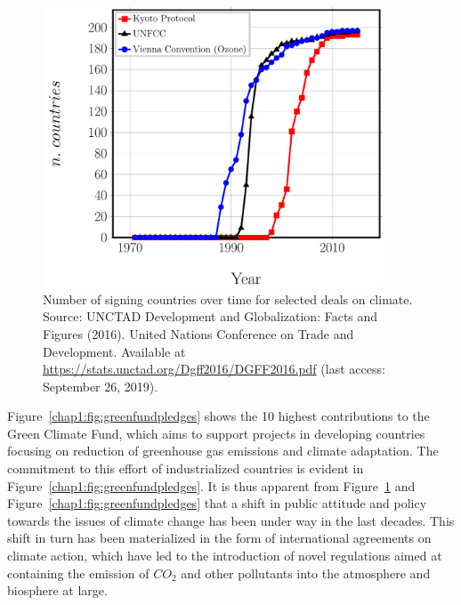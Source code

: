 \begin{description}
\begin{figure}[!h]
\includegraphics[width=0.9\textwidth]{pics/climate-deals-signataries.pdf}
\caption{Number of signing countries over time for selected deals on climate. Source: UNCTAD Development and Globalization: Facts and Figures (2016). United Nations Conference on Trade and Development. Available at \href{https://stats.unctad.org/Dgff2016/DGFF2016.pdf}{https://stats.unctad.org/Dgff2016/DGFF2016.pdf} (last access: September 26, 2019).}\label{chap1:fig:climatedealssignataries}
\end{figure}

Figure~\ref{chap1:fig:greenfundpledges} shows the 10 highest contributions to the Green Climate Fund, which aims to support projects in developing countries focusing on reduction of greenhouse gas emissions and climate adaptation. The commitment to this effort of industrialized countries is evident in Figure~\ref{chap1:fig:greenfundpledges}. It is thus apparent from Figure~\ref{chap1:fig:climatedealssignataries} and Figure~\ref{chap1:fig:greenfundpledges} that a shift in public attitude and policy towards the issues of climate change has been under way in the last decades. This shift in turn has been materialized in the form of international agreements on climate action, which have led to the introduction of novel regulations aimed at containing the emission of $CO_{2}$ and other pollutants into the atmosphere and biosphere at large.


\end{description}

